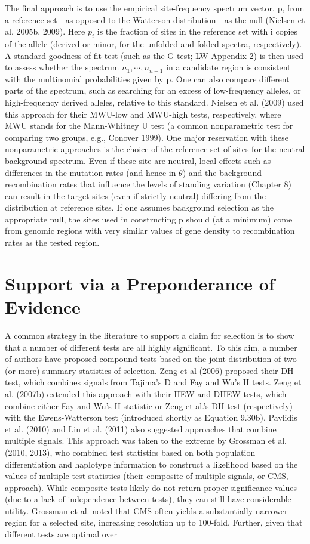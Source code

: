 \documentclass{article}
\begin{document}
The final approach is to use the empirical site-frequency spectrum vector, p, from a reference set—as opposed to the Watterson distribution—as the null (Nielsen et al. 2005b, 2009). Here  $ p_i $ is the fraction of sites in the reference set with i copies of the allele (derived or minor, for the unfolded and folded spectra, respectively). A standard goodness-of-fit test (such as the G-test; LW Appendix 2) is then used to assess whether the spectrum  $ n_1, \cdots, n_{n-1} $ in a candidate region is consistent with the multinomial probabilities given by p. One can also compare different parts of the spectrum, such as searching for an excess of low-frequency alleles, or high-frequency derived alleles, relative to this standard. Nielsen et al. (2009) used this approach for their MWU-low and MWU-high tests, respectively, where MWU stands for the Mann-Whitney U test (a common nonparametric test for comparing two groups, e.g., Conover 1999). One major reservation with these nonparametric approaches is the choice of the reference set of sites for the neutral background spectrum. Even if these site are neutral, local effects such as differences in the mutation rates (and hence in  $ \theta $) and the background recombination rates that influence the levels of standing variation (Chapter 8) can result in the target sites (even if strictly neutral) differing from the distribution at reference sites. If one assumes background selection as the appropriate null, the sites used in constructing p should (at a minimum) come from genomic regions with very similar values of gene density to recombination rates as the tested region.

\section{Support via a Preponderance of Evidence}
A common strategy in the literature to support a claim for selection is to show that a number of different tests are all highly significant. To this aim, a number of authors have proposed compound tests based on the joint distribution of two (or more) summary statistics of selection. Zeng et al (2006) proposed their DH test, which combines signals from Tajima's D and Fay and Wu's H tests. Zeng et al. (2007b) extended this approach with their HEW and DHEW tests, which combine either Fay and Wu's H statistic or Zeng et al.'s DH test (respectively) with the Ewens-Watterson test (introduced shortly as Equation 9.30b). Pavlidis et al. (2010) and Lin et al. (2011) also suggested approaches that combine multiple signals. This approach was taken to the extreme by Grossman et al. (2010, 2013), who combined test statistics based on both population differentiation and haplotype information to construct a likelihood based on the values of multiple test statistics (their composite of multiple signals, or CMS, approach). While composite tests likely do not return proper significance values (due to a lack of independence between tests), they can still have considerable utility. Grossman et al. noted that CMS often yields a substantially narrower region for a selected site, increasing resolution up to 100-fold. Further, given that different tests are optimal over
\end{document}
